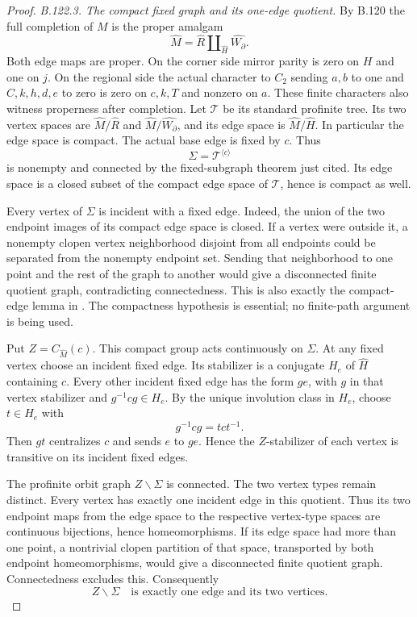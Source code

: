\begin{proof}
\emph{B.122.3. The compact fixed graph and its one-edge quotient.}
By B.120 the full completion of $M$ is the proper amalgam
\[
 \widehat M=\widehat R\amalg_{\widehat H}
                         \widehat{W_{\partial}}.
\]
Both edge maps are proper. On the corner side mirror parity
is zero on $H$ and one on $j$. On the regional side the
actual character to $C_2$ sending $a,b$ to one and
$C,k,h,d,e$ to zero is zero on $c,k,T$ and nonzero on $a$.
These finite characters also witness properness after completion.
Let $\mathscr T$ be its standard profinite tree. Its two vertex
spaces are $\widehat M/\widehat R$ and
$\widehat M/\widehat{W_{\partial}}$, and its edge space is
$\widehat M/\widehat H$. In particular the edge space is compact.
The actual base edge is fixed by $c$. Thus
\[
 \Sigma=\mathscr T^{\langle c\rangle}
\]
is nonempty and connected by the fixed-subgraph theorem just cited.
Its edge space is a closed subset of the compact edge space of
$\mathscr T$, hence is compact as well.

Every vertex of $\Sigma$ is incident with a fixed edge. Indeed,
the union of the two endpoint images of its compact edge space is
closed. If a vertex were outside it, a nonempty clopen vertex
neighborhood disjoint from all endpoints could be separated from
the nonempty endpoint set. Sending that neighborhood to one point
and the rest of the graph to another would give a disconnected
finite quotient graph, contradicting connectedness. This is also
exactly the compact-edge lemma in
\citet[Lemma~2.14]{B_ZalesskiiMelnikov1989}. The compactness
hypothesis is essential; no finite-path argument is being used.

Put $Z=C_{\widehat M}(c)$. This compact group acts continuously
on $\Sigma$. At any fixed vertex choose an incident fixed edge.
Its stabilizer is a conjugate $H_e$ of $\widehat H$ containing
$c$. Every other incident fixed edge has the form $g e$, with
$g$ in that vertex stabilizer and $g^{-1}cg\in H_e$. By the
unique involution class in $H_e$, choose $t\in H_e$ with
\[
 g^{-1}cg=tct^{-1}.
\]
Then $gt$ centralizes $c$ and sends $e$ to $ge$. Hence the
$Z$-stabilizer of each vertex is transitive on its incident fixed
edges.

The profinite orbit graph $Z\backslash\Sigma$ is connected.
The two vertex types remain distinct. Every vertex has exactly
one incident edge in this quotient. Thus its two endpoint maps
from the edge space to the respective vertex-type spaces are
continuous bijections, hence homeomorphisms. If its edge space
had more than one point, a nontrivial clopen partition of that
space, transported by both endpoint homeomorphisms, would give
a disconnected finite quotient graph. Connectedness excludes
this. Consequently
\begin{equation}\label{eq:B122-one-edge-orbit}
 Z\backslash\Sigma\quad\text{is exactly one edge and its two vertices}.
\end{equation}


\end{proof}
